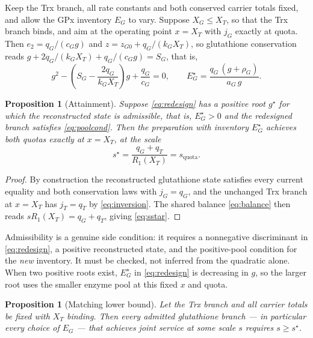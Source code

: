 \documentclass[11pt,a4paper]{article}
\theoremstyle{plain}
\newtheorem{proposition}[theorem]{Proposition}
\theoremstyle{definition}
\theoremstyle{remark}
\begin{document}
Keep the Trx branch, all rate constants and both conserved carrier totals fixed,
and allow the GPx inventory $E_G$ to vary. Suppose $X_G\le X_T$, so that the Trx
branch binds, and aim at the operating point $x=X_T$ with $j_G$ exactly at quota.
Then $e_2=q_G/(c_Gg)$ and $z=z_{G0}+q_G/(k_GX_T)$, so glutathione conservation
reads $g+2q_G/(k_GX_T)+q_G/(c_Gg)=S_G$, that is,
\begin{equation}\label{eq:redesign}
  g^2-\left(S_G-\frac{2q_G}{k_GX_T}\right)g+\frac{q_G}{c_G}=0,
  \qquad
  E_G^\star=\frac{q_G\,(g+\rho_G)}{a_G\,g}.
\end{equation}

\begin{proposition}[Attainment]\label{prop:attain}
Suppose \eqref{eq:redesign} has a positive root $g^\star$ for which the
reconstructed state is admissible, that is, $E_G^\star>0$ and the redesigned
branch satisfies \eqref{eq:poolcond}. Then the preparation with inventory
$E_G^\star$ achieves both quotas exactly at $x=X_T$, at the scale
\begin{equation}\label{eq:sstar}
  s^\star=\frac{q_G+q_T}{R_1(X_T)}=s_{\mathrm{quota}} .
\end{equation}
\end{proposition}

\begin{proof}
By construction the reconstructed glutathione state satisfies every current
equality and both conservation laws with $j_G=q_G$, and the unchanged Trx branch
at $x=X_T$ has $j_T=q_T$ by \eqref{eq:inversion}. The shared balance
\eqref{eq:balance} then reads $sR_1(X_T)=q_G+q_T$, giving \eqref{eq:sstar}.
\end{proof}

Admissibility is a genuine side condition: it requires a nonnegative discriminant
in \eqref{eq:redesign}, a positive reconstructed state, and the positive-pool
condition for the \emph{new} inventory. It must be checked, not inferred from the
quadratic alone. When two positive roots exist, $E_G^\star$ in \eqref{eq:redesign}
is decreasing in $g$, so the larger root uses the smaller enzyme pool at this
fixed $x$ and quota.

\begin{proposition}[Matching lower bound]\label{prop:lower}
Let the Trx branch and all carrier totals be fixed with $X_T$ binding. Then every
admitted glutathione branch --- in particular every choice of $E_G$ --- that
achieves joint service at some scale $s$ requires $s\ge s^\star$.
\end{proposition}
\end{document}
